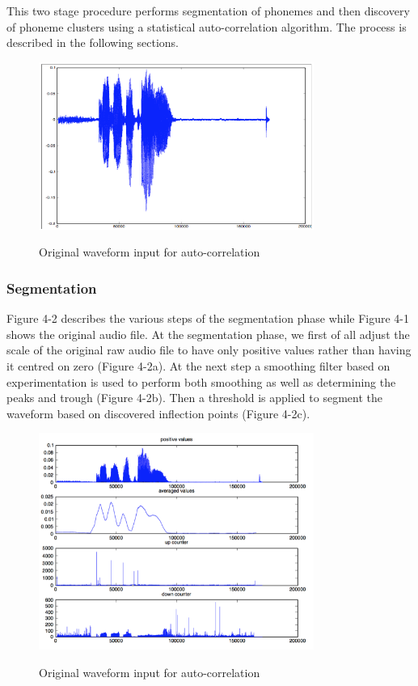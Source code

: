 This two stage procedure performs segmentation of phonemes and then discovery of phoneme clusters using a statistical auto-correlation algorithm.  The process is described in the following sections.
\begin{figure}
\centering
  \includegraphics[width=9cm]{thesis/images/corr}\\
  \caption{Original waveform input for auto-correlation}\label{fig_c3_exp01}
\end{figure}

\subsubsection{Segmentation}
Figure 4-2 describes the various steps of the segmentation phase while Figure 4-1 shows the original audio file. At the segmentation phase, we first of all adjust the scale of the original raw audio file to have only positive values rather than having it centred on zero (Figure 4-2a).  At the next step a smoothing filter based on experimentation is used to perform both smoothing as well as determining the peaks and trough (Figure 4-2b).  Then a threshold is applied to segment the waveform based on discovered inflection points (Figure 4-2c).  
\begin{figure}
\centering
  \includegraphics[width=9cm]{thesis/images/corr00}\\
  \caption{Original waveform input for auto-correlation}\label{fig_c3_exp02}
\end{figure}

